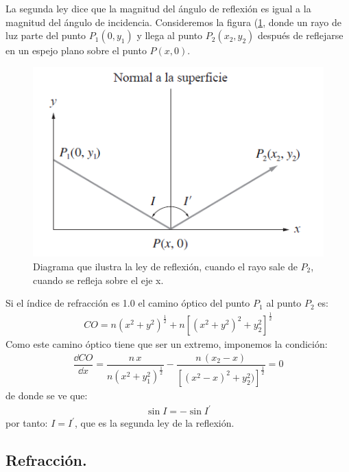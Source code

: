 \documentclass[14pt]{extarticle}
\begin{document}
La segunda ley dice que la magnitud del ángulo de reflexión es igual a la magnitud del ángulo de incidencia. Consideremos la figura (\ref{fig:figura_03}, donde un rayo de luz parte del punto $P_{1} (0, y_{1})$ y llega al punto $P_{2} (x_{2}, y_{2})$ después de reflejarse en un espejo plano sobre el punto $P (x, 0)$.
\begin{figure}[H]
    \centering
    \includegraphics[scale=0.75]{Imagenes/Optica_Geometrica_03.png}
    \caption{Diagrama que ilustra la ley de reflexión, cuando el rayo sale de $P_{2}$, cuando se refleja sobre el eje x.}
    \label{fig:figura_03}
\end{figure}
Si el índice de refracción es 1.0 el camino óptico del punto $P_{1}$ al punto $P_{2}$ es:
\begin{align}
CO = n (x^{2} + y^{2})^{\frac{1}{2}} + n \left[ (x^{2} + y^{2})^{2} + y_{2}^{2} \right]^{\frac{1}{2}}
\label{eq:ecuacion_I_05}
\end{align}
Como este camino óptico tiene que ser un extremo, imponemos la condición:
\begin{align}
\dfrac{\dd{CO}}{\dd{x}} = \dfrac{n \, x}{n (x^{2} + y_{1}^{2})^{\frac{1}{2}}} - \dfrac{n \,(x_{2} - x)}{ \left[ (x^{2} - x)^{2} + y_{2}^{2}) \right]^{\frac{1}{2}}} = 0
\label{eq:ecuacion_I_06} 
\end{align}
de donde se ve que:
\begin{align}
\sin I = - \sin I^{\prime}
\label{eq:ecuacion_I_07}
\end{align}
por tanto: $I = I^{\prime}$, que es la segunda ley de la reflexión.

\subsection{Refracción.}
\end{document}
